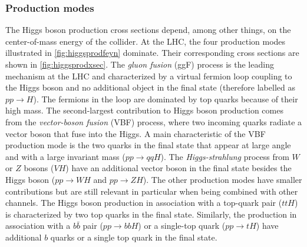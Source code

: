 \subsubsection{Production modes} 
The Higgs boson production cross sections depend, among other things, on the center-of-mass energy of the collider.
At the LHC, the four production modes illustrated in \cref{fig:higgsprodfeyn} dominate.
Their corresponding cross sections are shown in \cref{fig:higgsprodxsec}.
The \emph{gluon fusion} (ggF) process is the leading mechanism at the LHC and characterized by a virtual fermion loop coupling to the Higgs boson and no additional object in the final state (therefore labelled as $pp\rightarrow H$). 
The fermions in the loop are dominated by top quarks because of their high mass. 
The second-largest contribution to Higgs boson production comes from the \emph{vector-boson fusion} (VBF) process, where two incoming quarks radiate a vector boson that fuse into the Higgs.
A main characteristic of the VBF production mode is the two quarks in the final state that appear at large angle and with a large invariant mass ($pp\rightarrow qqH$).
The \emph{Higgs-strahlung} process from $W$ or $Z$ bosons ($VH$) have an additional vector boson in the final state besides the Higgs boson ($pp \rightarrow WH$ and $pp \rightarrow ZH$).
The other production modes have smaller contributions but are still relevant in particular when being combined with other channels.
The Higgs boson production in association with a top-quark pair ($ttH$) is characterized by two top quarks in the final state. Similarly, the production in association with a $b\bar{b}$ pair ($pp\rightarrow bbH$) or a single-top quark ($pp \rightarrow tH$) have additional $b$ quarks or a single top quark in the final state.

